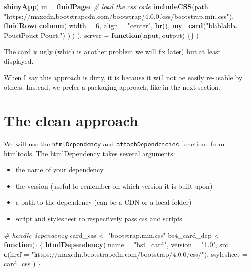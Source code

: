\documentclass[]{book}
\newenvironment{Shaded}{\begin{snugshade}}{\end{snugshade}}
\newcommand{\CommentTok}[1]{\textcolor[rgb]{0.56,0.35,0.01}{\textit{#1}}}
\newcommand{\ControlFlowTok}[1]{\textcolor[rgb]{0.13,0.29,0.53}{\textbf{#1}}}
\newcommand{\DataTypeTok}[1]{\textcolor[rgb]{0.13,0.29,0.53}{#1}}
\newcommand{\DecValTok}[1]{\textcolor[rgb]{0.00,0.00,0.81}{#1}}
\newcommand{\KeywordTok}[1]{\textcolor[rgb]{0.13,0.29,0.53}{\textbf{#1}}}
\newcommand{\NormalTok}[1]{#1}
\newcommand{\StringTok}[1]{\textcolor[rgb]{0.31,0.60,0.02}{#1}}
\providecommand{\tightlist}{%
  \setlength{\itemsep}{0pt}\setlength{\parskip}{0pt}}
\begin{document}
\begin{Shaded}
\begin{Highlighting}[]
\KeywordTok{shinyApp}\NormalTok{(}
  \DataTypeTok{ui =} \KeywordTok{fluidPage}\NormalTok{(}
    \CommentTok{# load the css code}
    \KeywordTok{includeCSS}\NormalTok{(}\DataTypeTok{path =} \StringTok{"https://maxcdn.bootstrapcdn.com/bootstrap/4.0.0/css/bootstrap.min.css"}\NormalTok{),}
    \KeywordTok{fluidRow}\NormalTok{(}
      \KeywordTok{column}\NormalTok{(}
        \DataTypeTok{width =} \DecValTok{6}\NormalTok{,}
        \DataTypeTok{align =} \StringTok{"center"}\NormalTok{,}
        \KeywordTok{br}\NormalTok{(),}
        \KeywordTok{my_card}\NormalTok{(}\StringTok{"blablabla. PouetPouet Pouet."}\NormalTok{)}
\NormalTok{      )}
\NormalTok{    )}
\NormalTok{  ),}
  \DataTypeTok{server =} \ControlFlowTok{function}\NormalTok{(input, output) \{\}}
\NormalTok{)}
\end{Highlighting}
\end{Shaded}

The card is ugly (which is another problem we will fix later) but at least displayed.

When I say this approach is dirty, it is because it will not be easily re-usable by others.
Instead, we prefer a packaging approach, like in the next section.

\hypertarget{the-clean-approach}{%
\section{The clean approach}\label{the-clean-approach}}

We will use the \texttt{htmlDependency} and \texttt{attachDependencies} functions from htmltools.
The htmlDependency takes several arguments:

\begin{itemize}
\tightlist
\item
  the name of your dependency
\item
  the version (useful to remember on which version it is built upon)
\item
  a path to the dependency (can be a CDN or a local folder)
\item
  script and stylesheet to respectively pass css and scripts
\end{itemize}

\begin{Shaded}
\begin{Highlighting}[]
\CommentTok{# handle dependency}
\NormalTok{card_css <-}\StringTok{ "bootstrap.min.css"}
\NormalTok{bs4_card_dep <-}\StringTok{ }\ControlFlowTok{function}\NormalTok{() \{}
  \KeywordTok{htmlDependency}\NormalTok{(}
    \DataTypeTok{name =} \StringTok{"bs4_card"}\NormalTok{,}
    \DataTypeTok{version =} \StringTok{"1.0"}\NormalTok{,}
    \DataTypeTok{src =} \KeywordTok{c}\NormalTok{(}\DataTypeTok{href =} \StringTok{"https://maxcdn.bootstrapcdn.com/bootstrap/4.0.0/css/"}\NormalTok{),}
    \DataTypeTok{stylesheet =}\NormalTok{ card_css}
\NormalTok{  )}
\NormalTok{\}}
\end{Highlighting}
\end{Shaded}
\end{document}
